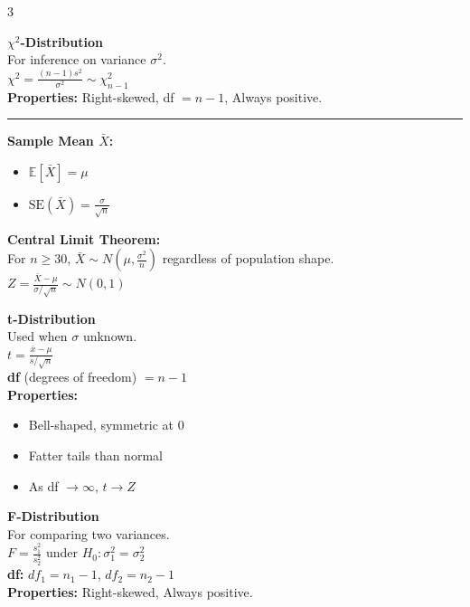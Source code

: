 \documentclass[8pt, letterpaper]{article}
\newcommand{\sectionhead}[1]{%
    \vspace{1.2mm}{\large\bfseries#1}\vspace{0.2mm}\hrule\vspace{0.8mm}%
}
\newcommand{\E}{\mathbb{E}}
\begin{document}
\begin{multicols}{3}
\begin{tcolorbox}[colback=gray!10, colframe=black, boxrule=0.3pt, left=1.5mm, right=1.5mm, top=1.5mm, bottom=1.5mm, before skip=1.5mm]
\textbf{$\chi^2$-Distribution} \\
For inference on variance $\sigma^2$. \\
$\chi^2 = \frac{(n-1)s^2}{\sigma^2} \sim \chi^2_{n-1}$ \\
\textbf{Properties:} Right-skewed, df $= n-1$, Always positive.
\end{tcolorbox}

\columnbreak

\sectionhead{Sampling Distributions}
\textbf{Sample Mean $\bar{X}$:}
\begin{itemize}
    \item $\E[\bar{X}] = \mu$
    \item $\text{SE}(\bar{X}) = \frac{\sigma}{\sqrt{n}}$
\end{itemize}
\textbf{Central Limit Theorem:} \\
For $n \ge 30$, $\bar{X} \sim N\left(\mu, \frac{\sigma^2}{n}\right)$ regardless of population shape. \\
$Z = \frac{\bar{X} - \mu}{\sigma/\sqrt{n}} \sim N(0,1)$ \\ 

\begin{tcolorbox}[colback=gray!10, colframe=black, boxrule=0.3pt, left=1.5mm, right=1.5mm, top=1.5mm, bottom=1.5mm, before skip=1.5mm]
\textbf{t-Distribution} \\
Used when $\sigma$ unknown. \\
$t = \frac{\bar{x} - \mu}{s/\sqrt{n}}$ \\
\textbf{df} (degrees of freedom) $= n-1$ \\
\textbf{Properties:}
\begin{itemize}
    \item Bell-shaped, symmetric at 0
    \item Fatter tails than normal
    \item As df $\to \infty$, $t \to Z$
\end{itemize}
\end{tcolorbox}



\begin{tcolorbox}[colback=gray!10, colframe=black, boxrule=0.3pt, left=1.5mm, right=1.5mm, top=1.5mm, bottom=1.5mm, before skip=1.5mm]
\textbf{F-Distribution} \\
For comparing two variances. \\
$F = \frac{s_1^2}{s_2^2}$ under $H_0: \sigma_1^2 = \sigma_2^2$ \\
\textbf{df:} $df_1 = n_1-1$, $df_2 = n_2-1$ \\
\textbf{Properties:} Right-skewed, Always positive.
\end{tcolorbox}


\end{multicols}
\end{document}
